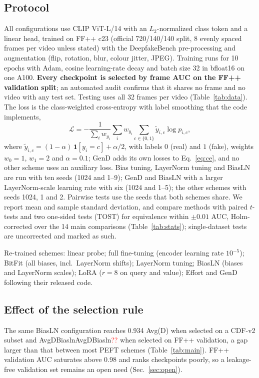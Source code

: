 \documentclass[fonts]{icst}
\newcommand{\num}[1]{\ifcsname #1\endcsname\csname #1\endcsname\else\textcolor{red}{??}\fi}
\begin{document}
\subsection{Protocol}
\label{sec:protocol}
All configurations use CLIP ViT-L/14 with an $L_2$-normalized class token and a linear head, trained on FF++ c23 (official 720/140/140 split, 8 evenly spaced frames per video unless stated) with the DeepfakeBench pre-processing and augmentation (flip, rotation, blur, colour jitter, JPEG). Training runs for 10 epochs with Adam, cosine learning-rate decay and batch size 32 in bfloat16 on one A100. \textbf{Every checkpoint is selected by frame AUC on the FF++ validation split}; an automated audit confirms that it shares no frame and no video with any test set. Testing uses all 32 frames per video (Table~\ref{tab:data}). The loss is the class-weighted cross-entropy with label smoothing that the code implements,
\begin{equation}
\mathcal{L}=-\frac{1}{\sum_i w_{y_i}}\sum_{i} w_{y_i}\sum_{c\in\{0,1\}}\tilde{y}_{i,c}\log p_{i,c},
\label{eq:ce}
\end{equation}
where $\tilde{y}_{i,c}=(1-\alpha)\,\mathbf{1}[y_i=c]+\alpha/2$, with labels $0$ (real) and $1$ (fake), weights $w_0=1$, $w_1=2$ and $\alpha=0.1$; GenD adds its own losses to Eq.~\eqref{eq:ce}, and no other scheme uses an auxiliary loss. Bias tuning, LayerNorm tuning and BiasLN are run with ten seeds (1024 and 1--9); GenD and BiasLN with a larger LayerNorm-scale learning rate with six (1024 and 1--5); the other schemes with seeds 1024, 1 and 2. Pairwise tests use the seeds that both schemes share. We report mean and sample standard deviation, and compare methods with paired $t$-tests and two one-sided tests (TOST) for equivalence within $\pm0.01$ AUC, Holm-corrected over the 14 main comparisons (Table~\ref{tab:stats}); single-dataset tests are uncorrected and marked as such.

Re-trained schemes: linear probe; full fine-tuning (encoder learning rate $10^{-5}$); BitFit (all biases, incl.\ LayerNorm shifts); LayerNorm tuning; BiasLN (biases and LayerNorm scales); LoRA ($r{=}8$ on query and value); Effort and GenD following their released code.

\subsection{Effect of the selection rule}
\label{sec:selection}
The same BiasLN configuration reaches 0.934 Avg(D) when selected on a CDF-v2 subset and \num{AvgDBiasln} when selected on FF++ validation, a gap larger than that between most PEFT schemes (Table~\ref{tab:main}). FF++ validation AUC saturates above 0.98 and ranks checkpoints poorly, so a leakage-free validation set remains an open need (Sec.~\ref{sec:open}).
\end{document}
